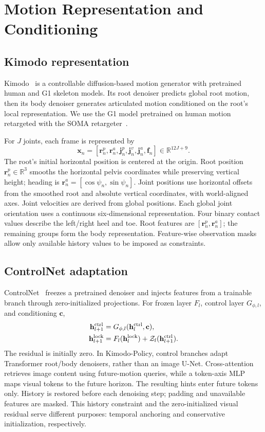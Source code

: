 \section{Motion Representation and Conditioning}
\label{sec:preliminaries}
\subsection{Kimodo representation}
Kimodo~\cite{kimodo} is a controllable diffusion-based motion generator with pretrained human and G1 skeleton models. Its root denoiser predicts global root motion, then its body denoiser generates articulated motion conditioned on the root's local representation. We use the G1 model pretrained on human motion retargeted with the SOMA retargeter~\cite{saito2026somaunifyingparametrichuman}.

For $J$ joints, each frame is represented by
\begin{equation}
\mathbf{x}_n=[\mathbf{r}^p_n,\mathbf{r}^a_n,\mathbf{j}^p_n,\mathbf{j}^v_n,\mathbf{j}^a_n,\mathbf{f}_n]
\in\mathbb{R}^{12J+9}.
\end{equation}
The root's initial horizontal position is centered at the origin. Root position $\mathbf{r}^p_n\in\mathbb{R}^3$ smooths the horizontal pelvis coordinates while preserving vertical height; heading is $\mathbf{r}^a_n=[\cos\psi_n,\sin\psi_n]$. Joint positions use horizontal offsets from the smoothed root and absolute vertical coordinates, with world-aligned axes. Joint velocities are derived from global positions. Each global joint orientation uses a continuous six-dimensional representation. Four binary contact values describe the left/right heel and toe. Root features are $[\mathbf{r}^p_n,\mathbf{r}^a_n]$; the remaining groups form the body representation. Feature-wise observation masks allow only available history values to be imposed as constraints.

\subsection{ControlNet adaptation}
ControlNet~\cite{zhang2023adding} freezes a pretrained denoiser and injects features from a trainable branch through zero-initialized projections. For frozen layer $F_l$, control layer $G_{\phi,l}$, and conditioning $\mathbf{c}$,
\begin{align}
\mathbf{h}^{\rm ctrl}_{l+1}&=G_{\phi,l}(\mathbf{h}^{\rm ctrl}_l,\mathbf{c}),\\
\mathbf{h}^{\rm lock}_{l+1}&=F_l(\mathbf{h}^{\rm lock}_l)+\mathcal{Z}_l(\mathbf{h}^{\rm ctrl}_{l+1}).
\end{align}
The residual is initially zero. In Kimodo-Policy, control branches adapt Transformer root/body denoisers, rather than an image U-Net. Cross-attention retrieves image content using future-motion queries, while a token-axis MLP maps visual tokens to the future horizon. The resulting hints enter future tokens only. History is restored before each denoising step; padding and unavailable features are masked. This history constraint and the zero-initialized visual residual serve different purposes: temporal anchoring and conservative initialization, respectively.

